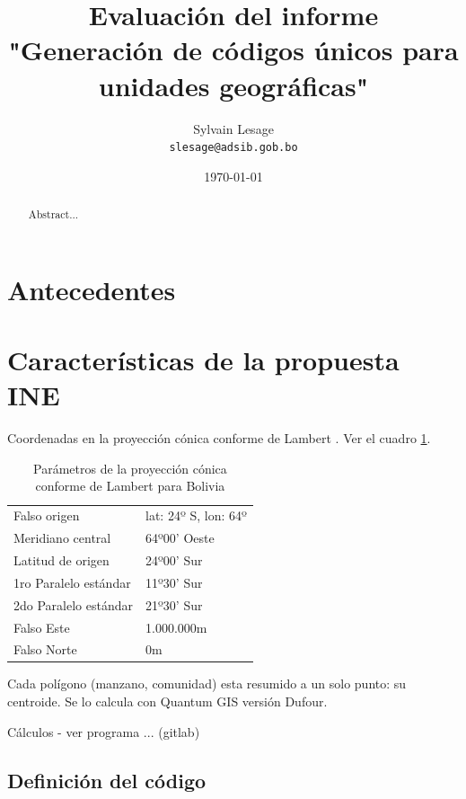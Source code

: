 \documentclass[letterpaper]{article}
\begin{document}
\title{Evaluación del informe\\"Generación de códigos únicos para unidades geográficas"}
\author{Sylvain Lesage\\
  \texttt{slesage@adsib.gob.bo}}
\date{\today}
\maketitle
 
\begin{abstract}
Abstract...
\end{abstract}

\section{Antecedentes}

\section{Características de la propuesta INE}

Coordenadas en la proyección cónica conforme de Lambert \cite[p.~33]{sunit07}. Ver el cuadro \ref{tab:lambert}.

\begin{table}
	\centering
	\begin{tabular}{|l|l|}
		\hline
		Falso origen & lat: 24º S, lon: 64º \\
		Meridiano central & 64º00' Oeste \\
		Latitud de origen & 24º00' Sur \\
		1ro Paralelo estándar & 11º30' Sur \\
		2do Paralelo estándar & 21º30' Sur \\
		Falso Este & 1.000.000m \\
		Falso Norte & 0m \\
		\hline	
	\end{tabular}
	\caption{Parámetros de la proyección cónica conforme de Lambert para Bolivia}
	\label{tab:lambert}
\end{table}

Cada polígono (manzano, comunidad) esta resumido a un solo punto: su centroide. Se lo calcula con Quantum GIS versión Dufour.

Cálculos - ver programa ... (gitlab)

\subsection{Definición del código}
\end{document}

